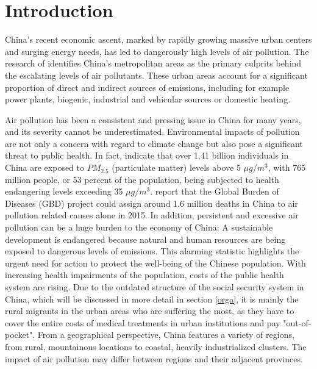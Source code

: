 \documentclass[
]{article}
\begin{document}
	\newpage
	
	\hypertarget{introduction}{%
		\section{Introduction}\label{introduction}}
	China's recent economic ascent, marked by rapidly growing massive urban centers and surging energy needs, has led to dangerously high levels of air pollution. The research of \cite{chan2008air} identifies China's metropolitan areas as the primary culprits behind the escalating levels of air pollutants. These urban areas account for a significant proportion of direct and indirect sources of emissions, including for example power plants, biogenic, industrial and vehicular sources or domestic heating. 

	Air pollution has been a consistent and pressing issue in China for many years, and its severity cannot be underestimated. Environmental impacts of pollution are not only a concern with regard to climate change but also pose a significant threat to public health. In fact, \cite{maruyama2022air} indicate that over 1.41 billion individuals in China are exposed to $PM_{2.5}$ (particulate matter) levels above 5 $\mu g/m^3$, with 765 million people, or 53 percent of the population, being subjected to health endangering levels exceeding 35 $\mu g/m^3$.
	\cite{song_air_2017} report that the Global Burden of Diseases (GBD) project could assign around 1.6 million deaths in China to air pollution related causes alone in 2015. In addition, persistent and excessive air pollution can be a huge burden to the economy of China: A sustainable development is endangered because natural and human resources are being exposed to dangerous levels of  emissions. This alarming statistic highlights the urgent need for action to protect the well-being of the Chinese population. With increasing health impairments of the population, costs of the public health system are rising. 
	Due to the outdated structure of the social security system in China, which will be discussed in more detail in section \ref{orga}, it is mainly the rural migrants in the urban areas who are suffering the most, as they have to cover the entire costs of medical treatments in urban institutions and pay "out-of-pocket". 
	From a geographical perspective, China features a variety of regions, from rural, mountainous locations to coastal, heavily industrialized clusters. The impact of air pollution may differ between regions and their adjacent provinces.\\ 
\end{document}
